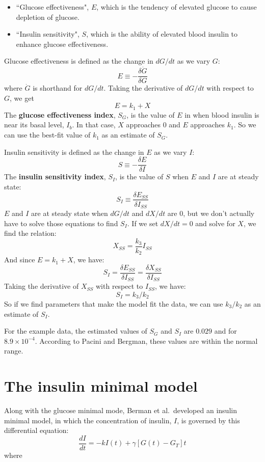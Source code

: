 \documentclass[12pt]{book}
\theoremstyle{exercise}
\begin{document}
\begin{itemize}

\item ``Glucose effectiveness", $E$, which is the tendency of elevated glucose to cause depletion of glucose.  

\item ``Insulin sensitivity", $S$, which is the ability of elevated blood insulin to enhance glucose effectiveness.

\end{itemize}

Glucose effectiveness is defined as the change in $dG/dt$ as we vary $G$:
%
\[ E \equiv - \frac{\delta \dot{G}}{\delta G} \]
%
where $\dot{G}$ is shorthand for $dG/dt$.  Taking the derivative of $dG/dt$ with respect to $G$, we get
%
\[ E = k_1 + X \]
%
The {\bf glucose effectiveness index}, $S_G$, is the value of $E$ in when blood insulin is near its basal level, $I_b$.  In that case, $X$ approaches 0 and $E$ approaches $k_1$.  So we can use the best-fit value of $k_1$ as an estimate of $S_G$.

Insulin sensitivity is defined as the change in $E$ as we vary $I$:
%
\[ S \equiv - \frac{\delta E}{\delta I} \]
%
The {\bf insulin sensitivity index}, $S_I$, is the value of $S$ when $E$ and $I$ are at steady state:
%
\[ S_I \equiv \frac{\delta E_{SS}}{\delta I_{SS}} \]
%
$E$ and $I$ are at steady state when $dG/dt$ and $dX/dt$ are 0, but we don't actually have to solve those equations to find $S_I$.  If we set $dX/dt = 0$ and solve for $X$, we find the relation:
%
\[ X_{SS} = \frac{k_3}{k_2} I_{SS} \]
%
And since $E = k_1 + X$, we have:
%
\[ S_I = \frac{\delta E_{SS}}{\delta I_{SS}} = \frac{\delta X_{SS}}{\delta I_{SS}} \]
%
Taking the derivative of $X_{SS}$ with respect to $I_{SS}$, we have:
%
\[ S_I = k_3 / k_2 \]
%
So if we find parameters that make the model fit the data, we can use $k_3 / k_2$ as an estimate of $S_I$.  

For the example data, the estimated values of $S_G$ and $S_I$ are $0.029$ and for $8.9 \times 10^{-4}$.  According to Pacini and Bergman, these values are within the normal range.


\section{The insulin minimal model}

Along with the glucose minimal mode, Berman et al.~developed an insulin minimal model, in which the concentration of insulin, $I$, is governed by this differential equation:
%
\[ \frac{dI}{dt} = -k I(t) + \gamma \left[ G(t) - G_T \right] t \]
%
where
\end{document}

